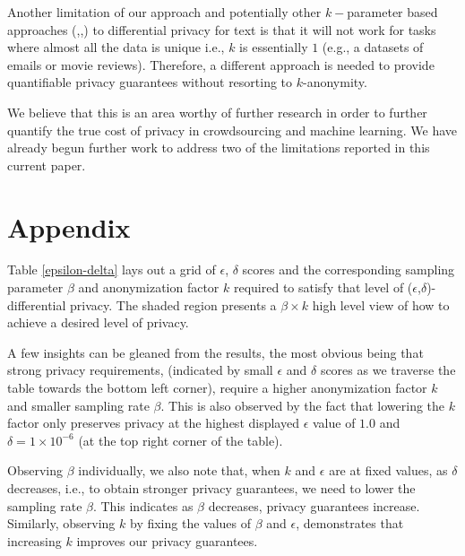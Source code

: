 \documentclass[letterpaper]{article}
\begin{document}
Another limitation of our approach and potentially other $k-$parameter based approaches (\cite{korolova2009releasing},\cite{gotz2012publishing},\cite{zhang2016safelog}) to differential privacy for text is that it will not work for tasks where almost all the data is unique i.e., $k$ is essentially $1$ (e.g., a datasets of emails or movie reviews). Therefore, a different approach is needed to provide quantifiable privacy guarantees without resorting to $k$-anonymity. 

We believe that this is an area worthy of further research in order to further quantify the true cost of privacy in crowdsourcing and machine learning. We have already begun further work to address two of the limitations reported in this current paper. 


\section{Appendix}


Table \ref{epsilon-delta} lays out a grid of $\epsilon$, $\delta$ scores and the corresponding sampling parameter $\beta$ and anonymization factor $k$ required to satisfy that level of ($\epsilon$,$\delta$)-differential privacy. The shaded region presents a $\beta \times k$ high level view of how to achieve a desired level of privacy. 

A few insights can be gleaned from the results, the most obvious being that strong privacy requirements, (indicated by small $\epsilon$ and $\delta$ scores as we traverse the table towards the bottom left corner), require a higher anonymization factor $k$ and smaller sampling rate $\beta$. This is also observed by the fact that lowering the $k$ factor only preserves privacy at the highest displayed $\epsilon$ value of $1.0$ and $\delta = 1 \times 10^{-6}$ (at the top right corner of the table).

Observing $\beta$ individually, we also note that, when $k$ and $\epsilon$ are at fixed values, as $\delta$ decreases, i.e., to obtain stronger privacy guarantees, we need to lower the sampling rate $\beta$. This indicates as $\beta$ decreases, privacy guarantees increase. Similarly, observing $k$ by fixing the values of $\beta$ and $\epsilon$, demonstrates that increasing $k$ improves our privacy guarantees.
\end{document}
